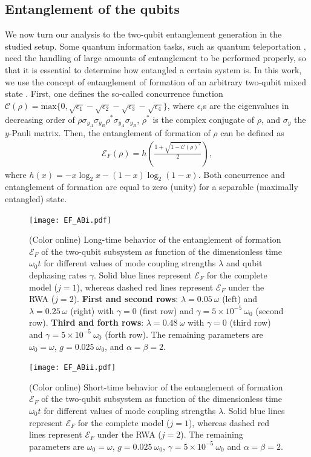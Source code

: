\documentclass[%
reprint,
amsmath,amssymb,
aps,
pra,
]{revtex4-1}
\begin{document}
\subsection{\label{subsec:ent}Entanglement of the qubits}
We now turn our analysis to the two-qubit entanglement generation in the studied setup. Some quantum information tasks, such as quantum teleportation \cite{ben93}, need the handling of large amounts of entanglement to be performed properly, so that it is essential to determine how entangled a certain system is. In this work, we use the concept of entanglement of formation of an arbitrary two-qubit mixed state \cite{woo98,horo09}. First, one defines the so-called concurrence function $\mathcal{C}(\rho) =\text{max}\{0, \sqrt{\epsilon_1}-\sqrt{\epsilon_2}-\sqrt{\epsilon_3}-\sqrt{\epsilon_4}\}$, where $\epsilon_i$s are the eigenvalues in decreasing order of $\rho\sigma_{y_A}\sigma_{y_B}\rho^*\sigma_{y_A}\sigma_{y_B}$, $\rho^*$ is the complex conjugate of $\rho$, and $\sigma_y$ the $y$-Pauli matrix. Then, the entanglement of formation of $\rho$ can be defined as
\begin{eqnarray}
 \mathcal{E}_F(\rho)=h\left(\frac{1+\sqrt{1-\mathcal{C}(\rho)^2}}{2}\right),
 \label{eq:eof}
\end{eqnarray}
where $h(x)=-x\log_2x-(1-x)\log_2(1-x)$. Both concurrence and entanglement of formation are equal to zero (unity) for a separable (maximally entangled) state. 

\begin{figure}
\texttt{[image: EF\_ABi.pdf]}
\caption{\label{fg:entAB} (Color online) Long-time behavior of the entanglement of formation $\mathcal{E}_F$ of the two-qubit subsystem as function of the dimensionless time $\omega_0 t$ for different values of mode coupling strengths $\lambda$ and qubit dephasing rates $\gamma$. Solid blue lines represent $\mathcal{E}_F$ for the complete model ($j=1$), whereas dashed red lines represent $\mathcal{E}_F$ under the RWA ($j=2$).  
\textbf{First and second rows}: $\lambda=0.05\ \omega$ (left) and $\lambda=0.25\ \omega$ (right) with $\gamma=0$ (first row) and $\gamma=5\times 10^{-5}\ \omega_0$ (second row). \textbf{Third and forth rows}: $\lambda=0.48\ \omega$ with $\gamma=0$ (third row) and $\gamma=5\times 10^{-5}\ \omega_0$ (forth row). The remaining parameters are $\omega_0=\omega $, $g=0.025\ \omega_0$, and $\alpha=\beta=2$.}
\end{figure} 
\begin{figure}[h!]
\centering
\texttt{[image: EF\_ABii.pdf]}
\caption{\label{fg:entABii} (Color online) Short-time behavior of the entanglement of formation $\mathcal{E}_F$ of the two-qubit subsystem as function of the dimensionless time $\omega_0 t$ for different values of mode coupling strengths $\lambda$. Solid blue lines represent $\mathcal{E}_F$ for the complete model ($j=1$), whereas dashed red lines represent $\mathcal{E}_F$ under the RWA ($j=2$). %
The remaining parameters are $\omega_0=\omega$, $g=0.025\ \omega_0$, $\gamma=5\times10^{-5}\ \omega_0$ and $\alpha=\beta=2$.}
\end{figure}
\end{document}
